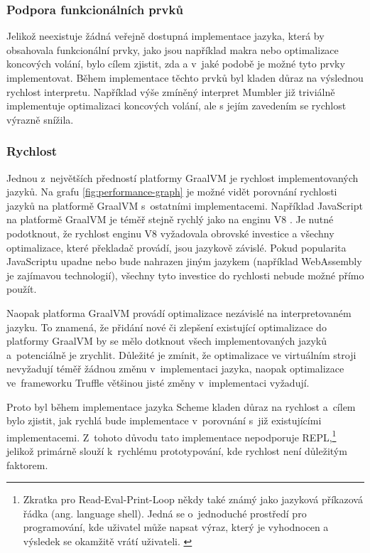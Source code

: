 \documentclass[
  master,
  biblatex,
  figures=true,
  theorems,
  sourcecodes,
  glossaries,
  index
]{kidiplom}
\begin{document}
\subsubsection{Podpora funkcionálních prvků}
Jelikož neexistuje žádná veřejně dostupná implementace jazyka, která by obsahovala funkcionální prvky, jako jsou například makra nebo optimalizace koncových volání, bylo cílem zjistit, zda a v~jaké podobě je možné tyto prvky implementovat. Během implementace těchto prvků byl kladen důraz na výslednou rychlost interpretu. Například výše zmíněný interpret Mumbler již triviálně implementuje optimalizaci koncových volání, ale s jejím zavedením se rychlost výrazně snížila. 


\subsubsection{Rychlost}
Jednou z~největších předností platformy GraalVM je rychlost implementovaných jazyků. Na grafu \ref{fig:performance-graph} je možné vidět porovnání rychlosti jazyků na platformě GraalVM s~ostatními implementacemi. Například JavaScript na platformě GraalVM je téměř stejně rychlý jako na enginu V8 \cite{javascript-speed-v8-engine}. Je nutné podotknout, že rychlost enginu V8 vyžadovala obrovské investice a všechny optimalizace, které překladač provádí, jsou jazykově závislé. Pokud popularita JavaScriptu upadne nebo bude nahrazen jiným jazykem (například WebAssembly je zajímavou technologií), všechny tyto investice do rychlosti nebude možné přímo použít.  

Naopak platforma GraalVM provádí optimalizace nezávislé na interpretovaném jazyku. To znamená, že přidání nové či zlepšení existující optimalizace do platformy GraalVM by se mělo dotknout všech implementovaných jazyků a~potenciálně je zrychlit. Důležité je zmínit, že optimalizace ve virtuálním stroji nevyžadují téměř žádnou změnu v~implementaci jazyka, naopak optimalizace ve~frameworku Truffle většinou jisté změny v~implementaci vyžadují.  

Proto byl během implementace jazyka Scheme kladen důraz na rychlost a~cílem bylo zjistit, jak rychlá bude implementace v~porovnání s~již existujícími implementacemi. Z~tohoto důvodu tato implementace nepodporuje REPL,\footnote{Zkratka pro Read-Eval-Print-Loop někdy také známý jako jazyková příkazová řádka (ang. language shell). Jedná se o~jednoduché prostředí pro programování, kde uživatel může napsat výraz, který je vyhodnocen a výsledek se okamžitě vrátí uživateli. \cite{repl}} jelikož primárně slouží k~rychlému prototypování, kde rychlost není důležitým faktorem.
\end{document}
